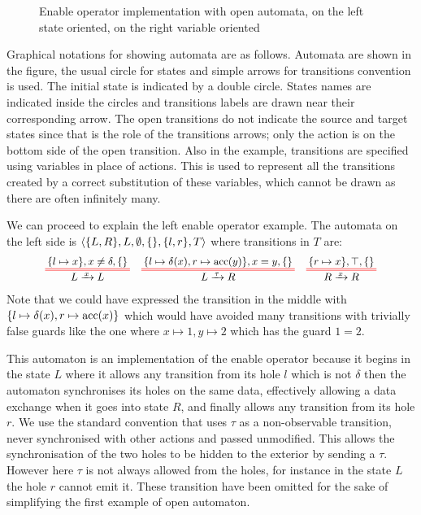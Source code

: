 \documentclass{article}
\begin{document}
\begin{exi}
\begin{figure}
\centering

\vrule

\caption{Enable operator implementation with open automata, on the left state oriented, on the right variable oriented}
\label{fig:enable}
\end{figure}

Graphical notations for showing automata are as follows.
Automata are shown in the figure, the usual circle for states and simple arrows for transitions convention is used.
The initial state is indicated by a double circle.
States names are indicated inside the circles and transitions labels are drawn near their corresponding arrow.
The open transitions do not indicate the source and target states since that is the role of the transitions arrows; only the action is on the bottom side of the open transition.
Also in the example, transitions are specified using variables in place of actions.
This is used to represent all the transitions created by a correct substitution of these variables, which cannot be drawn as there are often infinitely many.

We can proceed to explain the left enable operator example.
The automata on the left side is \(\left<{\left\{L, R\right\}},L,\emptyset,{\left\{\right\}},{\left\{l, r\right\}},T\right>\) where transitions in \(T\) are:
\begin{align*}
	\OT{L}{L}{x}{\mbrc{l \mapsto x}}{x \neq \delta}{\mbrc{}} &&
	\OT{L}{R}{\tau}{\mbrc{l \mapsto \delta\mpar{x}, r \mapsto \act{acc}\mpar{y}}}{x = y}{\mbrc{}} &&
	\OT{R}{R}{x}{\mbrc{r \mapsto x}}{\top}{\mbrc{}}
\end{align*}
Note that we could have expressed the transition in the middle with \({\left\{l \mapsto \delta{\left(x\right)}, r \mapsto \mathrm{acc}{\left(x\right)}\right\}}\) which would have avoided many transitions with trivially false guards like the one where \(x \mapsto 1, y \mapsto 2\) which has the guard \(1 = 2\).

This automaton is an implementation of the enable operator because it begins in the state \(L\) where it allows any transition from its hole \(l\) which is not \(\delta\) then the automaton synchronises its holes on the same data, effectively allowing a data exchange when it goes into state \(R\), and finally allows any transition from its hole \(r\).
We use the standard convention that uses \(\tau\) as a non-observable transition, never synchronised with other actions and passed unmodified.
This allows the synchronisation of the two holes to be hidden to the exterior by sending a \(\tau\).
However here \(\tau\) is not always allowed from the holes, for instance in the state \(L\) the hole \(r\) cannot emit it.
These transition have been omitted for the sake of simplifying the first example of open automaton.
\end{exi}
\end{document}
